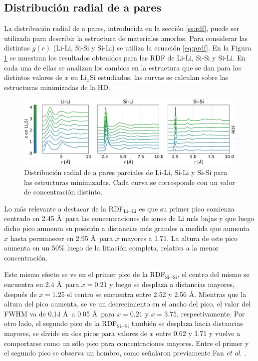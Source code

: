 \subsection{Distribución radial de a pares}

La distribución radial de a pares, introducida en la sección \ref{ss:rdf},
puede ser utilizada para describir la estructura de materiales amorfos. Para 
considerar las distintas $g(r)$ (Li-Li, Si-Si y Si-Li) se utiliza la 
ecuación \ref{eq:prdf}. En la Figura \ref{fig:rdf} se muestran los resultados 
obtenidos para las RDF de Li-Li, Si-Si y Si-Li. En cada una de ellas se analizan
los cambios en la estructura que se dan para los distintos valores de $x$ en 
Li$_x$Si estudiados, las curvas se calculan sobre las estructuras minimizadas 
de la HD.
\begin{figure}[h!]
    \centering
    \includegraphics[width=\textwidth]{Silicio/caracterizacion/resultados/rdf/rdf.png}
    \caption{Distribución radial de a pares parciales de Li-Li, Si-Li y Si-Si 
    para las estructuras minimizadas. Cada curva se corresponde con un valor de 
    concentración distinto.}
    \label{fig:rdf}
\end{figure}

Lo más relevante a destacar de la RDF$_{\text{Li}-\text{Li}}$ es que su primer 
pico comienza 
centrado en 2.45 \AA\ para las concentraciones de iones de Li más bajas y que 
luego dicho pico aumenta su posición a distancias más grandes a medida que aumenta
$x$ hasta permanecer en 2.95 \AA\ para $x$ mayores a 1.71. La altura de este pico
aumenta en un 50\% luego de la litiación completa, relativa a la menor 
concentración.

Este mismo efecto se ve en el primer pico de la RDF$_{\text{Si}-\text{Si}}$, el 
centro del mismo
se encuentra en 2.4 \AA\ para $x = 0.21$ y luego se desplaza a distancias
mayores, después de $x = 1.25$ el centro se encuentra entre 2.52 y 2.56 \AA.
Mientras que la altura del pico aumenta, se ve un decrecimiento en el ancho 
del pico, el valor del FWHM va de 0.14 \AA\ a 0.05 \AA\ para $x = 0.21$ y 
$x = 3.75$, respectivamente. Por otro lado, el segundo pico de la RDF$_{\text{Si}-\text{Si}}$
también se desplaza hacia distancias mayores, se divide en dos picos para valores 
de $x$ entre 0.62 y 1.71 y vuelve a comportarse como un sólo pico para 
concentraciones mayores. Entre el primer y el segundo pico se observa un hombro,
como señalaron previamente Fan \textit{et al.} \cite{fan2013}.

